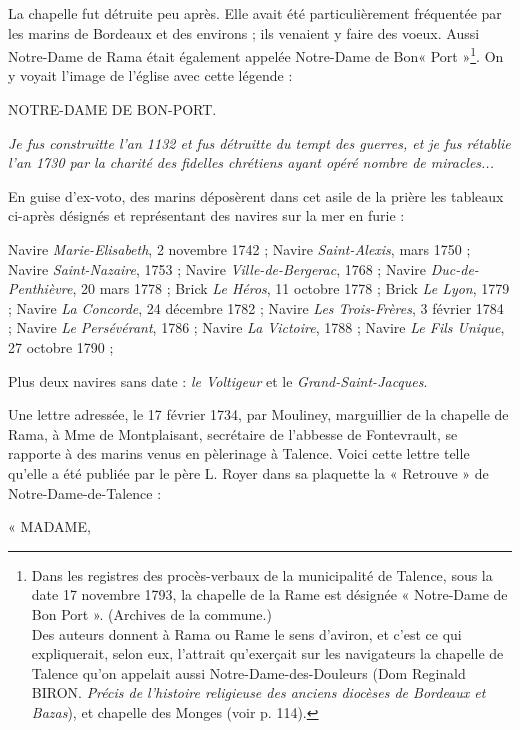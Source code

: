 \documentclass[a4paper,11pt]{book}
\begin{document}
La chapelle fut détruite peu après. Elle avait été particulièrement fréquentée par les marins de Bordeaux et des environs ; ils venaient y faire des voeux. Aussi Notre-Dame de Rama était également appelée Notre-Dame de Bon« Port »\footnote{Dans les registres des procès-verbaux de la municipalité de Talence, sous la date 17 novembre 1793, la chapelle de la Rame est désignée « Notre-Dame de Bon Port ». (Archives de la commune.)\\Des auteurs donnent à Rama ou Rame le sens d'aviron, et c'est ce qui expliquerait, selon eux, l'attrait qu'exerçait sur les navigateurs la chapelle de Talence qu'on appelait aussi Notre-Dame-des-Douleurs (Dom Reginald BIRON. \textit{Précis de l'histoire religieuse des anciens diocèses de Bordeaux et Bazas}), et chapelle des Monges (voir p. 114).}. On y voyait l'image de l'église avec cette légende :

\begin{center}
NOTRE-DAME DE BON-PORT.
\end{center}

\textit{Je fus construitte l'an 1132 et fus détruitte du tempt des guerres, et je fus rétablie l'an 1730 par la charité des fidelles chrétiens ayant opéré nombre de miracles...}

En guise d'ex-voto, des marins déposèrent dans cet asile de la prière les tableaux ci-après désignés et représentant des navires sur la mer en furie : 

Navire \textit{Marie-Elisabeth}, 2 novembre 1742 ;
Navire \textit{Saint-Alexis}, mars 1750 ; 
Navire \textit{Saint-Nazaire}, 1753 ;
Navire \textit{Ville-de-Bergerac}, 1768 ;
Navire \textit{Duc-de-Penthièvre}, 20 mars 1778 ;
Brick \textit{Le Héros}, 11 octobre 1778 ;
Brick \textit{Le Lyon}, 1779 ;
Navire \textit{La Concorde}, 24 décembre 1782 ;
Navire \textit{Les Trois-Frères}, 3 février 1784 ; 
Navire \textit{Le Persévérant}, 1786 ; 
Navire \textit{La Victoire}, 1788 ;
Navire \textit{Le Fils Unique}, 27 octobre 1790 ;

Plus deux navires sans date : \textit{le Voltigeur} et le \textit{Grand-Saint-Jacques}.

Une lettre adressée, le 17 février 1734, par Mouliney, marguillier de la chapelle de Rama, à Mme de Montplaisant, secrétaire de l'abbesse de Fontevrault, se rapporte à des marins venus en pèlerinage à Talence. Voici cette lettre telle qu'elle a été publiée par le père L. Royer dans sa plaquette la « Retrouve » de Notre-Dame-de-Talence :

« MADAME, 
\end{document}
